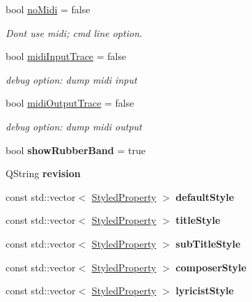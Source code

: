\begin{DoxyCompactItemize}
\mbox{\label{namespace_ms_af6f452dd89ea732bf67f097b1e8176b8}} 
bool \hyperlink{namespace_ms_af6f452dd89ea732bf67f097b1e8176b8}{no\+Midi} = false
\begin{DoxyCompactList}\small\item\em Dont use midi; cmd line option. \end{DoxyCompactList}\item 
\mbox{\label{namespace_ms_a77530e3b212b6ac75e8fcacea479a337}} 
bool \hyperlink{namespace_ms_a77530e3b212b6ac75e8fcacea479a337}{midi\+Input\+Trace} = false
\begin{DoxyCompactList}\small\item\em debug option\+: dump midi input \end{DoxyCompactList}\item 
\mbox{\label{namespace_ms_a9ce8905531c3e92b0cf6d1630fa58b0a}} 
bool \hyperlink{namespace_ms_a9ce8905531c3e92b0cf6d1630fa58b0a}{midi\+Output\+Trace} = false
\begin{DoxyCompactList}\small\item\em debug option\+: dump midi output \end{DoxyCompactList}\item 
\mbox{\label{namespace_ms_acb4508c8d4c5c2c22abb0a02c2d2aa86}} 
bool {\bfseries show\+Rubber\+Band} = true
\item 
\mbox{\label{namespace_ms_ab993cd87672b19e29282726410216e4f}} 
Q\+String {\bfseries revision}
\item 
const std\+::vector$<$ \hyperlink{struct_ms_1_1_styled_property}{Styled\+Property} $>$ {\bfseries default\+Style}
\item 
const std\+::vector$<$ \hyperlink{struct_ms_1_1_styled_property}{Styled\+Property} $>$ {\bfseries title\+Style}
\item 
const std\+::vector$<$ \hyperlink{struct_ms_1_1_styled_property}{Styled\+Property} $>$ {\bfseries sub\+Title\+Style}
\item 
const std\+::vector$<$ \hyperlink{struct_ms_1_1_styled_property}{Styled\+Property} $>$ {\bfseries composer\+Style}
\item 
const std\+::vector$<$ \hyperlink{struct_ms_1_1_styled_property}{Styled\+Property} $>$ {\bfseries lyricist\+Style}
\item 

\end{DoxyCompactItemize}
